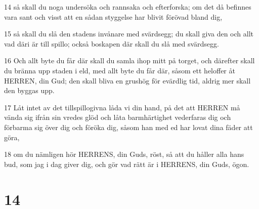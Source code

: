 \par 14 så skall du noga undersöka och rannsaka och efterforska; om det då befinnes vara sant och visst att en sådan styggelse har blivit förövad bland dig,
\par 15 så skall du slå den stadens invånare med svärdsegg; du skall giva den och allt vad däri är till spillo; också boskapen där skall du slå med svärdsegg.
\par 16 Och allt byte du får där skall du samla ihop mitt på torget, och därefter skall du bränna upp staden i eld, med allt byte du får där, såsom ett heloffer åt HERREN, din Gud; den skall bliva en grushög för evärdlig tid, aldrig mer skall den byggas upp.
\par 17 Låt intet av det tillspillogivna låda vi din hand, på det att HERREN må vända sig ifrån sin vredes glöd och låta barmhärtighet vederfaras dig och förbarma sig över dig och föröka dig, såsom han med ed har lovat dina fäder att göra,
\par 18 om du nämligen hör HERRENS, din Guds, röst, så att du håller alla hans bud, som jag i dag giver dig, och gör vad rätt är i HERRENS, din Guds, ögon.

\chapter{14}

